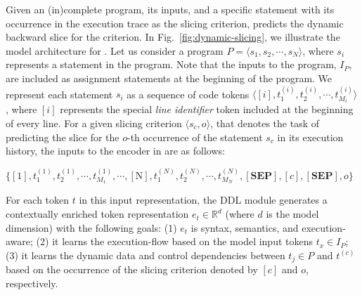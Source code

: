 Given an (in)complete program, its inputs, and a specific statement with its occurrence in the execution trace as the slicing criterion, {\tool} predicts the dynamic backward slice for the criterion. In Fig.~\ref{fig:dynamic-slicing}, we illustrate the model architecture for {\tool}.
Let us consider a program $P = \langle s_1, s_2, \cdots, s_{N}\rangle$, where $s_i$ represents a statement in the program. Note that the inputs to the program, $I_P$, are included as assignment statements at the beginning of the program. We represent each statement $s_i$ as a sequence of code tokens \(\langle [i], t_1^{(i)}, t_2^{(i)}, \cdots, t_{M_i}^{(i)}\rangle\), where $[i]$ represents the special {\em line identifier} token included at the beginning of every line. For a given slicing criterion $\langle s_c, o \rangle$, that denotes the task of predicting the slice for the $o$-th occurrence of the statement $s_c$ in its execution history, the inputs to the encoder in {\tool} are as follows:

\begin{center}
$\{ [1], t_1^{(1)}, t_2^{(1)}, \cdots, t_{M_1}^{(1)}, \cdots, [\text{N}], t_1^{(N)}, t_2^{(N)}, \cdots, t_{M_N}^{(N)}, [\textbf{SEP}], [c], [\textbf{SEP}], o \}$
\end{center}

For each token $t$ in this input representation, the DDL module generates a contextually enriched token representation $e_t \in \mathbb{R}^d$ (where $d$ is the model dimension) with the following goals: (1) $e_t$ is syntax, semantics, and execution-aware; (2) it learns the execution-flow based on the model input tokens $t_x \in I_P$; (3) it learns the dynamic data and control dependencies between $t_j \in P$ and $t^{(c)}$ based on the occurrence of the slicing criterion denoted by $[c]$ and $o$, respectively.

